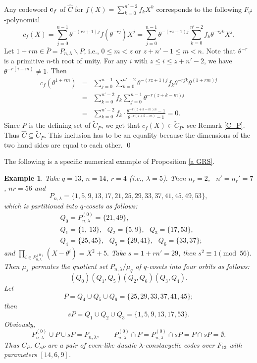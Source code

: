 \documentclass{article}
\newtheorem{Example}[Theorem]{Example}
\numberwithin{equation}{section}
\numberwithin{table}{section}
\begin{document}
Any codeword ${\bf c}_f$ of $\hat C$ for $f(X)=\sum_{k=0}^{n'-2}f_kX^k$
corresponds to the following $F_{q^2}$-polynomial
$$
 c_f(X)=\sum_{j=0}^{n-1} \theta^{-(rz+1)j}f(\theta^{-rj})X^j
 =\sum_{j=0}^{n-1} \theta^{-(rz+1)j}\sum_{k=0}^{n'-2} f_k \theta^{-rjk}X^j.
$$
Let $1+rm\in \overline P=P_{n,\lambda}\backslash P$,
i.e., $0\le m<z$ or $z+n'-1\le m<n$.
Note that $\theta^{-r}$ is a primitive $n$-th root of unity. 
For any $i$ with $z\le i\le z+n'-2$,
we have $\theta^{-r(i-m)}\ne 1$. Then
\begin{eqnarray*}
c_f(\theta^{1+rm})&=&\sum_{j=0}^{n-1}\sum_{k=0}^{n'-2}
\theta^{-(rz+1)j}f_k \theta^{-rjk}\theta^{(1+rm)j}\\
&=&\sum_{k=0}^{n'-2}f_k\sum_{j=0}^{n-1}\theta^{-r(z+k-m)j}\\
&=&\sum_{k=0}^{n'-2}f_k\cdot
  \frac{\theta^{-r(z+k-m)n}-1}{\theta^{-r(z+k-m)}-1}=0.
\end{eqnarray*}
Since $\overline P$ is the defining set of $\widetilde C_P$,
we get that $c_f(X)\in \widetilde C_P$, see Remark \ref{C_P}. Thus
$\hat C\subseteq \widetilde C_P$.
This inclusion has to be an equality because the dimensions of the two hand sides
are equal to each other.  \qed

\medskip
The following is a specific numerical example of Proposition \ref{a GRS}.

\begin{Example}\rm Take $q=13$, $n=14$, $r=4$ (i.e., $\lambda=5$).
Then $n_r=2$,~ $n'=n_r'=7$, $nr=56$ and
$$P_{n,\lambda}=\{1,5,9,13,17,21,25,29,33,37,41,45,49,53\},$$
which is partitioned into $q$-cosets as follows:
\begin{align*}
&Q_0=P_{n,\lambda}^{(0)}=\{21,49\},\\
&Q_1=\{1,~13\},~~~Q_2=\{5,9\},~~~Q_3=\{17,53\},\\
&Q_4=\{25,45\},~~~Q_5=\{29,41\},~~~Q_6=\{33,37\};
\end{align*}
and
$\prod_{i\in P_{n,\lambda}^{(0)}}(X-\theta^i)=X^2+5. $
Take $s=1+rn'=29$, then $s^2\equiv 1\pmod{56}$.
Then $\mu_s$ permutes the quotient set $P_{n,\lambda}/\mu_q$ of $q$-cosets
into four orbits as follows:
$$  (Q_0)(Q_1,Q_5)(Q_2,Q_6)(Q_3,Q_4). $$
Let
$$ P=Q_4\cup Q_5\cup Q_6=\{25,29,33,37,41,45\}; $$
then
$$ sP=Q_1\cup Q_2\cup Q_3=\{1,5,9,13,17,53\}.$$
Obviously,
$$ P_{n,\lambda}^{(0)}\cup P\cup sP=P_{n,\lambda},\qquad
 P_{n,\lambda}^{(0)}\cap P=P_{n,\lambda}^{(0)}\cap sP=P\cap sP=\emptyset. $$
Thus $C_P$, $C_{sP}$ are a pair of even-like duadic $\lambda$-constacyclic codes
over $F_{13}$ with parameters $[14,6,9]$.
\end{Example}
\end{document}
